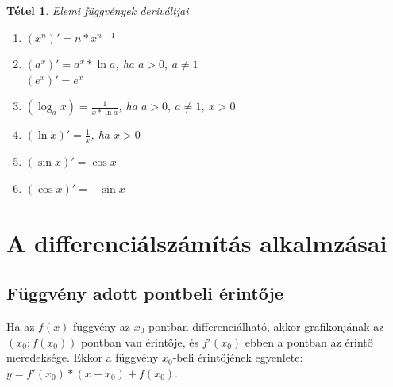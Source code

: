 \documentclass[twoside,12pt]{report}
\newtheorem{theorem}{Tétel}[section]
\theoremstyle{definition}
\begin{document}
	\begin{theorem}
		Elemi függvények deriváltjai
		\begin{enumerate}
			\item $(x^n)'=n*x^{n-1}$
			\item $(a^x)'=a^x*\ln a$, ha $a>0,\ a\ne1$\\
				  $(e^x)'=e^x$
			\item $\left(\log_ax\right)=\frac{1}{x*\ln a}$, ha $a>0,\ a\ne1,\ x>0$
			\item $(\ln x)'=\frac{1}{x}$, ha $x>0$
			\item $(\sin x)'=\cos x$
			\item $(\cos x)'=-\sin x$
		\end{enumerate}
	\end{theorem}
\section{A differenciálszámítás alkalmzásai}
	\subsection{Függvény adott pontbeli érintője}
	Ha az $f(x)$ függvény az $x_0$ pontban differenciálható, akkor grafikonjának az $(x_0;f(x_0))$ pontban van érintője, és $f'(x_0)$ ebben a pontban az érintő meredeksége. Ekkor a függvény $x_0$-beli érintőjének egyenlete: $y=f'(x_0)*(x-x_0)+f(x_0)$.
\end{document}
